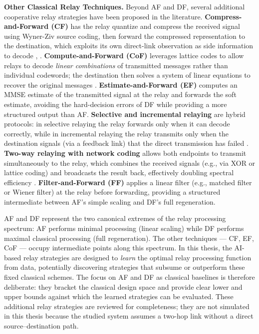 \textbf{Other Classical Relay Techniques.} Beyond AF and DF, several additional cooperative relay strategies have been proposed in the literature. \textbf{Compress-and-Forward (CF)} has the relay quantize and compress the received signal using Wyner-Ziv source coding, then forward the compressed representation to the destination, which exploits its own direct-link observation as side information to decode \cite{cover1979capacity}, \cite{elgamal2011network}. \textbf{Compute-and-Forward (CoF)} leverages lattice codes to allow relays to decode \emph{linear combinations} of transmitted messages rather than individual codewords; the destination then solves a system of linear equations to recover the original messages \cite{nazer2011compute}. \textbf{Estimate-and-Forward (EF)} computes an MMSE estimate of the transmitted signal at the relay and forwards the soft estimate, avoiding the hard-decision errors of DF while providing a more structured output than AF. \textbf{Selective and incremental relaying} are hybrid protocols: in selective relaying the relay forwards only when it can decode correctly, while in incremental relaying the relay transmits only when the destination signals (via a feedback link) that the direct transmission has failed \cite{laneman2004cooperative}. \textbf{Two-way relaying with network coding} allows both endpoints to transmit simultaneously to the relay, which combines the received signals (e.g., via XOR or lattice coding) and broadcasts the result back, effectively doubling spectral efficiency \cite{rankov2007spectral}. \textbf{Filter-and-Forward (FF)} applies a linear filter (e.g., matched filter or Wiener filter) at the relay before forwarding, providing a structured intermediate between AF's simple scaling and DF's full regeneration.

AF and DF represent the two canonical extremes of the relay processing spectrum: AF performs minimal processing (linear scaling) while DF performs maximal classical processing (full regeneration). The other techniques --- CF, EF, CoF --- occupy intermediate points along this spectrum. In this thesis, the AI-based relay strategies are designed to \emph{learn} the optimal relay processing function from data, potentially discovering strategies that subsume or outperform these fixed classical schemes. The focus on AF and DF as classical baselines is therefore deliberate: they bracket the classical design space and provide clear lower and upper bounds against which the learned strategies can be evaluated. These additional relay strategies are reviewed for completeness; they are not simulated in this thesis because the studied system assumes a two-hop link without a direct source--destination path.

